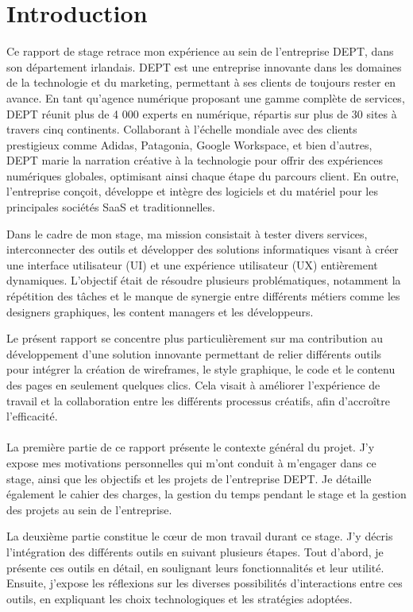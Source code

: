 \chapter{Introduction}

Ce rapport de stage retrace mon expérience au sein de l'entreprise DEPT, dans son département irlandais. DEPT est une entreprise innovante dans les domaines de la technologie et du marketing, permettant à ses clients de toujours rester en avance. En tant qu'agence numérique proposant une gamme complète de services, DEPT réunit plus de 4 000 experts en numérique, répartis sur plus de 30 sites à travers cinq continents. Collaborant à l'échelle mondiale avec des clients prestigieux comme Adidas, Patagonia, Google Workspace, et bien d'autres, DEPT marie la narration créative à la technologie pour offrir des expériences numériques globales, optimisant ainsi chaque étape du parcours client. En outre, l'entreprise conçoit, développe et intègre des logiciels et du matériel pour les principales sociétés SaaS et traditionnelles.

Dans le cadre de mon stage, ma mission consistait à tester divers services, interconnecter des outils et développer des solutions informatiques visant à créer une interface utilisateur (UI) et une expérience utilisateur (UX) entièrement dynamiques. L'objectif était de résoudre plusieurs problématiques, notamment la répétition des tâches et le manque de synergie entre différents métiers comme les designers graphiques, les content managers et les développeurs.

Le présent rapport se concentre plus particulièrement sur ma contribution au développement d'une solution innovante permettant de relier différents outils pour intégrer la création de wireframes, le style graphique, le code et le contenu des pages en seulement quelques clics. Cela visait à améliorer l'expérience de travail et la collaboration entre les différents processus créatifs, afin d'accroître l'efficacité.
\\ \\
La première partie de ce rapport présente le contexte général du projet. J'y expose mes motivations personnelles qui m'ont conduit à m'engager dans ce stage, ainsi que les objectifs et les projets de l'entreprise DEPT. Je détaille également le cahier des charges, la gestion du temps pendant le stage et la gestion des projets au sein de l'entreprise.


La deuxième partie constitue le cœur de mon travail durant ce stage. J'y décris l'intégration des différents outils en suivant plusieurs étapes. Tout d'abord, je présente ces outils en détail, en soulignant leurs fonctionnalités et leur utilité. Ensuite, j'expose les réflexions sur les diverses possibilités d'interactions entre ces outils, en expliquant les choix technologiques et les stratégies adoptées.

